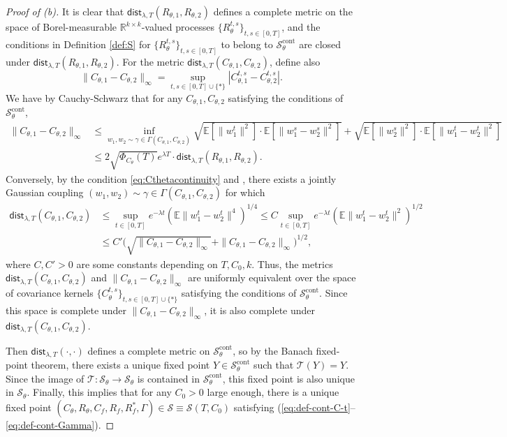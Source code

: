 \documentclass[11pt,letterpaper,reqno]{amsart}
\theoremstyle{definition}
\def\E{\mathbb{E}}
\def\R{\mathbb{R}}
\def\cS{\mathcal{S}}
\def\Ct{C_\theta}
\def\pCt{\Phi_{\Ct}}
\newcommand{\lbddst}[2]{\mathsf{dist}_{\lambda,T}(#1,#2)}
\newcommand{\norm}[1]{\|#1\|}
\newcommand{\brk}[1]{\left[{#1}\right]} %
\begin{document}
\begin{proof}[Proof of (b)]
It is clear that $\lbddst{R_{\theta,1}}{R_{\theta,2}}$ defines a complete metric
on the space of Borel-measurable $\R^{k \times k}$-valued
processes $\{R_\theta^{t,s}\}_{t,s \in [0,T]}$, and the conditions in
Definition \ref{def:S} for
$\{R_\theta^{t,s}\}_{t,s \in [0,T]}$ to belong to $\cS_\theta^{\text{cont}}$ are
closed under $\lbddst{R_{\theta,1}}{R_{\theta,2}}$. For the metric
$\lbddst{C_{\theta,1}}{C_{\theta,2}}$, define also
\[\|C_{\theta,1}-C_{\theta,2}\|_\infty
=\sup_{t,s \in [0,T] \cup \{*\}} |C_{\theta,1}^{t,s}-C_{\theta,2}^{t,s}|.\]
We have by Cauchy-Schwarz that
for any $C_{\theta,1},C_{\theta,2}$ satisfying the conditions of
$\cS_\theta^{\text{cont}}$,
\begin{align*}
\|C_{\theta,1}-C_{\theta,2}\|_\infty &\leq
\inf_{w_1,w_2 \sim \gamma \in \Gamma(C_{\theta,1},C_{\theta,2})}
\sqrt{\E \brk{\norm{w_1^t}^2} \cdot \E \brk{\norm{w_1^s - w_2^s}^2}} + \sqrt{\E
\brk{\norm{w_2^s}^2} \cdot \E \brk{\norm{w_1^t - w_2^t}^2}} \nonumber \\
	& \leq 2\sqrt{\pCt(T)} e^{\lambda T} \cdot
\lbddst{R_{\theta,1}}{R_{\theta,2}}.
\end{align*}
Conversely, by the condition \eqref{eq:Cthetacontinuity} and
\cite[Lemma D.1]{fan2025dynamical2}, there exists a jointly
Gaussian coupling $(w_1,w_2) \sim \gamma \in \Gamma(C_{\theta,1},C_{\theta,2})$
for which
\begin{align*}
\lbddst{C_{\theta,1}}{C_{\theta,2}}
&\leq \sup_{t \in [0,T]} e^{-\lambda t}(\E\|w_1^t-w_2^t\|^4)^{1/4}
\leq C\sup_{t \in [0,T]} e^{-\lambda t}(\E\|w_1^t-w_2^t\|^2)^{1/2}\\
&\leq C'\Big(\sqrt{\|C_{\theta,1}-C_{\theta,2}\|_\infty}
+\|C_{\theta,1}-C_{\theta,2}\|_\infty\Big)^{1/2},
\end{align*}
where $C,C'>0$ are some constants depending on $T,C_0,k$. Thus, the metrics
$\lbddst{C_{\theta,1}}{C_{\theta,2}}$ and
$\|C_{\theta,1}-C_{\theta,2}\|_\infty$ are uniformly equivalent over the space
of covariance kernels $\{C_\theta^{t,s}\}_{t,s \in [0,T] \cup \{*\}}$
satisfying the conditions of $\cS_\theta^{\text{cont}}$. Since this space is
complete under $\|C_{\theta,1}-C_{\theta,2}\|_\infty$, it is also complete under
$\lbddst{C_{\theta,1}}{C_{\theta,2}}$.

Then $\lbddst{\cdot}{\cdot}$ defines a complete metric on
$\cS_\theta^{\text{cont}}$, so by the Banach fixed-point theorem, there exists a
unique fixed point $Y \in \mathcal{S}^{\mathrm{cont}}_\theta$ such that
$\mathcal{T}(Y)=Y$. Since the image of $\mathcal{T}:\cS_\theta \to \cS_\theta$
is contained in $\cS_\theta^\text{cont}$, this fixed point is also unique in
$\cS_\theta$. Finally, this implies that for any
$C_0>0$ large enough, there is a unique fixed point
$(C_\theta,R_\theta,C_f,R_f,R_f^*,\Gamma)
\in \cS \equiv \cS(T,C_0)$ satisfying
(\ref{eq:def-cont-C-t}--\ref{eq:def-cont-Gamma}).
\end{proof}
\end{document}

